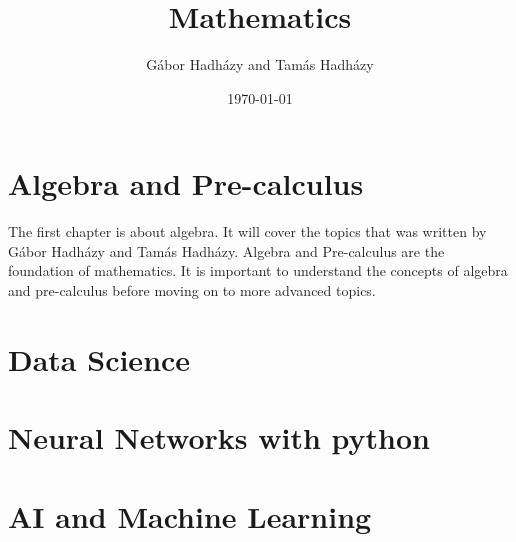 \documentclass[a4paper,12pt]{book}
\author{Gábor Hadházy and Tamás Hadházy}
\title{Mathematics}
\date{\today}
\begin{document}
\maketitle

\tableofcontents

\chapter{Algebra and Pre-calculus}
The first chapter is about algebra. It will cover the topics that was written by Gábor Hadházy and Tamás Hadházy. Algebra and Pre-calculus are the foundation of mathematics. It is important to understand the concepts of algebra and pre-calculus before moving on to more advanced topics.


\chapter{Data Science}

\chapter{Neural Networks with python}

\chapter{AI and Machine Learning}
\end{document}
